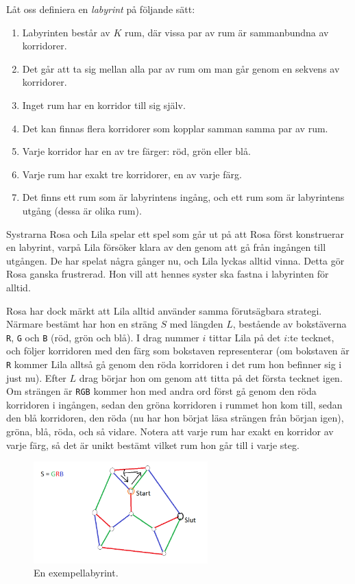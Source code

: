 \def\version{1}

Låt oss definiera en \textit{labyrint} på följande sätt:
\begin{enumerate}
  \item Labyrinten består av $K$ rum, där vissa par av rum är sammanbundna av korridorer.
  \item Det går att ta sig mellan alla par av rum om man går genom en sekvens av korridorer.
  \item Inget rum har en korridor till sig själv.
  \item Det kan finnas flera korridorer som kopplar samman samma par av rum.
  \item Varje korridor har en av tre färger: röd, grön eller blå.
  \item Varje rum har exakt tre korridorer, en av varje färg.
  \item Det finns ett rum som är labyrintens ingång, och ett rum som är labyrintens utgång (dessa är olika rum).
\end{enumerate}

Systrarna Rosa och Lila spelar ett spel som går ut på att Rosa först konstruerar en labyrint, varpå Lila försöker klara av den genom att gå från ingången till utgången.
De har spelat några gånger nu, och Lila lyckas alltid vinna.
Detta gör Rosa ganska frustrerad.
Hon vill att hennes syster ska fastna i labyrinten för alltid.

Rosa har dock märkt att Lila alltid använder samma förutsägbara strategi.
Närmare bestämt har hon en sträng $S$ med längden $L$, bestående av bokstäverna \texttt{R}, \texttt{G} och \texttt{B} (röd, grön och blå).
I drag nummer $i$ tittar Lila på det $i$:te tecknet, och följer korridoren med den färg som bokstaven representerar (om bokstaven är \texttt{R} kommer Lila alltså gå genom den röda korridoren i det rum hon befinner sig i just nu).
Efter $L$ drag börjar hon om genom att titta på det första tecknet igen.
Om strängen är \texttt{RGB} kommer hon med andra ord först gå genom den röda korridoren i ingången, sedan den gröna korridoren i rummet hon kom till, sedan den blå korridoren, den röda (nu har hon börjat läsa strängen från början igen), gröna, blå, röda, och så vidare.
Notera att varje rum har exakt en korridor av varje färg, så det är unikt bestämt vilket rum hon går till i varje steg.

\begin{figure}[h!]
  \centering
  \includegraphics[width=0.6\textwidth]{labyrintgraf2.png}
  \caption{En exempellabyrint.}
\end{figure}

